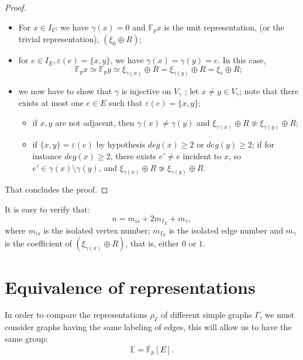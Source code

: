 \documentclass[preprint,12pt,authoryear]{elsarticle}
\theoremstyle{definition}
\begin{document}
\begin{proof}\mbox{}
\begin{itemize}
\item[$\bullet$] For $x\in I_V$:  we have $\gamma(x) = 0$ and  $\mathbb{F}_p x$ is the unit representation, (or   the trivial representation),  $(\xi_{0}\oplus R)$;
\item[$\bullet$] for  $e \in I_{E}, \varepsilon(e)=\{x, y \}$, we have $ \gamma(x)=\gamma(y)=e$. In this case, 
$$\mathbb{F}_p x\simeq \mathbb{F}_p y \simeq \xi_{\gamma(x)}\oplus R=\xi_{\gamma(y)}\oplus R= \xi_e \oplus R;$$
\item[$\bullet$] we now have to show that $\gamma$ is injective on $V_{\gamma}$ ; let $x\neq y 
\in V_{\gamma}$; note  that there  exists at most one $e \in E$ such that $\varepsilon(e)=\{x, y\}$; 

\begin{itemize}
\item[-] if $x, y$ are not adjacent, then $\gamma(x) \neq \gamma(y)$ and  $ \xi_{\gamma(x)}\oplus R \not\simeq \xi_{\gamma(y)}\oplus R$;
\item[-] if $\{x,y \}=\varepsilon(e)$ by hypothesis $deg(x) \ge 2$ or $deg(y) \ge 2$; if for instance  $deg(x) \ge 2$, there exists $e'\neq e$ incident to $x$, so $e' \in \gamma(x) \setminus \gamma(y)$, and  $ \xi_{\gamma(x)}\oplus R \not\simeq \xi_{\gamma(y)}\oplus R$.
\end{itemize}
\end{itemize}
That concludes the proof.
\end{proof}
It is easy to verify that:
\begin{equation}
n=  m_{is}+ 2m_{I_{E}}+ m_{\gamma},
\end{equation}
where $m_{is}$ is the isolated vertex number; $m_{I_{E}}$ is the isolated edge number and $m_{\gamma}$ is the coefficient of $ \left(\xi_{\gamma(x)}\oplus R\right)$, that is, either $0$ or $1$.



\section{Equivalence of representations}
In order to compare the representations $\rho_{\Gamma}$ of different simple graphs $\Gamma$, we must consider graphs having the same labeling of edges, this will allow us to have the same group:
\[
 \mathbb{E}= \overline{\mathbb{F}}_p[E].
 \]

\end{document}
